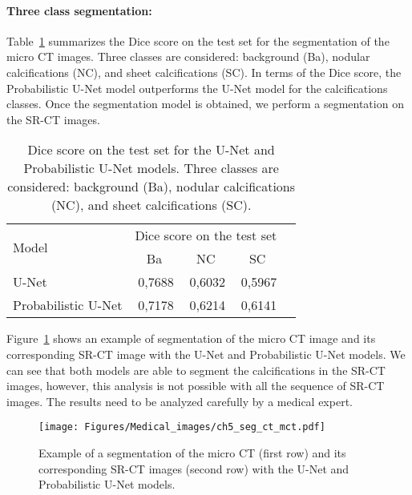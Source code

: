 \paragraph*{Three class segmentation: }
Table~\ref{tab:dice_score_test} 
summarizes the Dice score on the test set
for the segmentation of the micro CT images.
Three classes are considered: background (Ba), nodular calcifications (NC), 
and sheet calcifications (SC). 
In terms of the Dice score, the Probabilistic U-Net model
outperforms the U-Net model for the calcifications classes.
Once the segmentation model is obtained, we perform a 
segmentation on the SR-CT images.\\
\begin{table}[htb!]
    \begin{center}
    \begin{tabular}{|l|r|r|r|r|}
    \hline
    \multirow{2}{*}{Model}  &\multicolumn{3}{c|}{Dice score on the test set}\\
    \cline{2-4} 
      & \multicolumn{1}{c|}{Ba} & \multicolumn{1}{c|}{NC} & \multicolumn{1}{c|}{SC} \\ 
      \hline \hline
      \multicolumn{1}{|l|}{U-Net}      &0,7688   & 0,6032  & 0,5967  \\ \hline
      \multicolumn{1}{|l|}{Probabilistic U-Net}    & 0,7178 & 0,6214 & 0,6141\\ \hline
      \end{tabular}
      \vspace{-0.2cm}
      \caption{Dice score on the test set for the U-Net and Probabilistic U-Net models.
      Three classes are considered: background (Ba), nodular calcifications (NC), 
      and sheet calcifications (SC).}      
    \label{tab:dice_score_test}
    \end{center}
\end{table}

Figure~\ref{fig:proba_unet_sr_ct}
shows an example of segmentation of the micro CT image and its corresponding SR-CT image
with the U-Net and Probabilistic U-Net models.
We can see that both models are able to 
segment the calcifications in the SR-CT images, however, this analysis is
not possible with all the sequence of SR-CT images. 
The results need to be analyzed carefully by a medical expert.\\

\begin{figure}[htb!]
    \centering
    \texttt{[image: Figures/Medical\_images/ch5\_seg\_ct\_mct.pdf]}
    \caption{Example of a segmentation of the micro CT (first row) and 
    its corresponding SR-CT images (second row) 
    with the U-Net and Probabilistic U-Net models. }
    \label{fig:proba_unet_sr_ct}
\end{figure}


